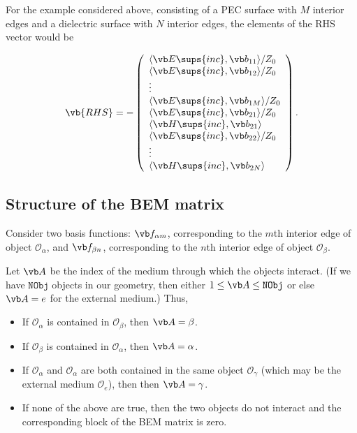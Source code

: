 For the example considered above, consisting of a PEC surface
with $M$ interior edges and a dielectric surface with $N$ 
interior edges, the elements of the RHS vector would be 

\setlength{\extrarowheight}{3pt}
$$ \vb{RHS}=-\left(\begin{array}{l}
   \langle\vb E\sups{inc}, \vb b_{11} \rangle  / Z_0  
\\
   \langle\vb E\sups{inc}, \vb b_{12} \rangle  / Z_0 
\\
   \vdots 
\\
   \langle\vb E\sups{inc}, \vb b_{1M} \rangle  / Z_0 
\\
   \langle\vb E\sups{inc}, \vb b_{21} \rangle  / Z_0 
\\
   \langle\vb H\sups{inc}, \vb b_{21} \rangle 
\\
   \langle\vb E\sups{inc}, \vb b_{22} \rangle / Z_0 
\\
   \vdots
\\
   \langle\vb H\sups{inc}, \vb b_{2N} \rangle
   \end{array}\right).
$$

\subsection{Structure of the BEM matrix}

Consider two basis functions: $\vb f_{\alpha m}$, corresponding
to the $m$th interior edge of object $\mathcal{O}_\alpha$,
and $\vb f_{\beta n}$, corresponding to the $n$th interior edge
of object $\mathcal{O}_\beta.$ 

Let $\vb A$ be the index of the medium through which the 
objects interact. (If we have $\texttt{NObj}$ objects in 
our geometry, then either $1\le \vb A \le \texttt{NObj}$ 
or else $\vb A=e$ for the external medium.) Thus,

\begin{itemize}
 \item If $\mathcal{O}_\alpha$ is contained in $\mathcal{O}_\beta$, 
       then $\vb A=\beta$.
 \item If $\mathcal{O}_\beta$ is contained in $\mathcal{O}_\alpha$, 
       then $\vb A=\alpha$.
 \item If $\mathcal{O}_\alpha$ and $\mathcal{O}_\alpha$ are both
       contained in the same object $\mathcal{O}_\gamma$ (which may
       be the external medium $\mathcal{O}_e$), then  
       then $\vb A=\gamma$.
 \item If none of the above are true, then the two objects do not
       interact and the corresponding block of the BEM matrix is
       zero.
\end{itemize}

